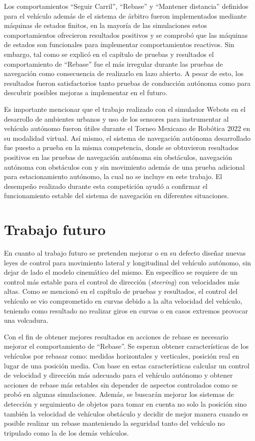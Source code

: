 Los comportamientos ``Seguir Carril'', ``Rebase'' y ``Mantener distancia'' definidos para el vehículo además de el sistema de árbitro fueron implementados mediante máquinas de estados finitos, en la mayoría de las simulaciones estos comportamientos ofrecieron resultados positivos y se comprobó que las máquinas de estados son funcionales para implementar comportamientos reactivos. Sin embargo, tal como se explicó en el capítulo de pruebas y resultados el comportamiento de ``Rebase'' fue el más irregular durante las pruebas de navegación como consecuencia de realizarlo en lazo abierto. A pesar de esto, los resultados fueron satisfactorios tanto pruebas de conducción autónoma como para descubrir posibles mejoras a implementar en el futuro.

Es importante mencionar que el trabajo realizado con el simulador Webots en el desarrollo de ambientes urbanos y uso de los sensores para instrumentar al vehículo autónomo fueron útiles durante el Torneo Mexicano de Robótica 2022 en su modalidad virtual. Así mismo, el sistema de navegación autónoma desarrollado fue puesto a prueba en la misma competencia, donde se obtuvieron resultados positivos en las pruebas de navegación autónoma sin obstáculos, navegación autónoma con obstáculos con y sin movimiento además de una prueba adicional para estacionamiento autónomo, la cual no se incluye en este trabajo. El desempeño realizado durante esta competición ayudó a confirmar el funcionamiento estable del sistema de navegación en diferentes situaciones.

\section{Trabajo futuro} \label{sec:trabajo_futuro}

En cuanto al trabajo futuro se pretenden mejorar o en su defecto diseñar nuevas leyes de control para movimiento lateral y longitudinal del vehículo autónomo, sin dejar de lado el modelo cinemático del mismo. En específico se requiere de un control más estable para el control de dirección (\textit{steering}) con velocidades más altas. Como se mencionó en el capítulo de pruebas y resultados, el control del vehículo se vio comprometido en curvas debido a la alta velocidad del vehículo, teniendo como resultado no realizar giros en curvas o en casos extremos provocar una volcadura.

Con el fin de obtener mejores resultados en acciones de rebase es necesario mejorar el comportamiento de ``Rebase''. Se esperan obtener características de los vehículos por rebasar como: medidas horizontales y verticales, posición real en lugar de una posición media. Con base en estas características calcular un control de velocidad y dirección más adecuado para el vehículo autónomo y obtener acciones de rebase más estables sin depender de aspectos controlados como se probó en algunas simulaciones. Además, se buscarán mejorar los sistemas de detección y seguimiento de objetos para tomar en cuenta no solo la posición sino también la velocidad de vehículos obstáculo y decidir de mejor manera cuando es posible realizar un rebase manteniendo la seguridad tanto del vehículo no tripulado como la de los demás vehículos. 

